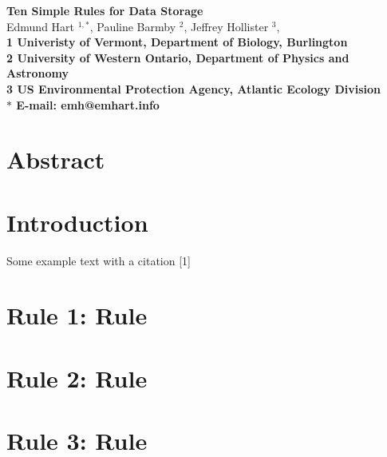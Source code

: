 \documentclass[10pt,letterpaper]{article}
\date{}
\begin{document}
\vspace*{0.35in}


\begin{flushleft}
{\Large
\textbf{Ten Simple Rules for Data Storage}
}
\newline
\\
Edmund Hart $^{1 ,\ast}$,
Pauline Barmby $^{2 }$,
Jeffrey Hollister $^{3 }$,
\\
\bigskip
\bf{1} Univeristy of Vermont, Department of Biology, Burlington
\\
\bf{2} University of Western Ontario, Department of Physics and Astronomy
\\
\bf{3} US Environmental Protection Agency, Atlantic Ecology Division
\\
\bigskip
 $\ast$ E-mail: emh@emhart.info 



\end{flushleft}

\section*{Abstract}\label{abstract}

\linenumbers

\section*{Introduction}\label{introduction}

Some example text with a citation {[}1{]}

\section*{Rule 1: Rule}\label{rule-1-rule}

\section*{Rule 2: Rule}\label{rule-2-rule}

\section*{Rule 3: Rule}\label{rule-3-rule}
\end{document}
